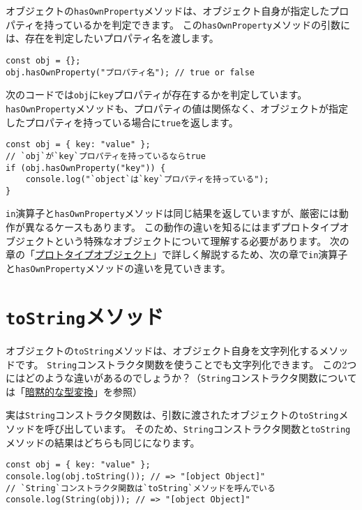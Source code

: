 オブジェクトの\texttt{hasOwnProperty}メソッドは、オブジェクト自身が指定したプロパティを持っているかを判定できます。
この\texttt{hasOwnProperty}メソッドの引数には、存在を判定したいプロパティ名を渡します。

\begin{lstlisting}
const obj = {};
obj.hasOwnProperty("プロパティ名"); // true or false
\end{lstlisting}

次のコードでは\texttt{obj}に\texttt{key}プロパティが存在するかを判定しています。
\texttt{hasOwnProperty}メソッドも、プロパティの値は関係なく、オブジェクトが指定したプロパティを持っている場合に\texttt{true}を返します。

\begin{lstlisting}
const obj = { key: "value" };
// `obj`が`key`プロパティを持っているならtrue
if (obj.hasOwnProperty("key")) {
    console.log("`object`は`key`プロパティを持っている");
}
\end{lstlisting}

\texttt{in}演算子と\texttt{hasOwnProperty}メソッドは同じ結果を返していますが、厳密には動作が異なるケースもあります。
この動作の違いを知るにはまずプロトタイプオブジェクトという特殊なオブジェクトについて理解する必要があります。
次の章の「\href{../prototype-object/README.md}{プロトタイプオブジェクト}」で詳しく解説するため、次の章で\texttt{in}演算子と\texttt{hasOwnProperty}メソッドの違いを見ていきます。

\hypertarget{toString-method}{%
\section{\texorpdfstring{\texttt{toString}メソッド}{toStringメソッド}}\label{toString-method}}

オブジェクトの\texttt{toString}メソッドは、オブジェクト自身を文字列化するメソッドです。
\texttt{String}コンストラクタ関数を使うことでも文字列化できます。
この2つにはどのような違いがあるのでしょうか？（\texttt{String}コンストラクタ関数については「\href{../implicit-coercion/README.md\#to-string}{暗黙的な型変換}」を参照）

実は\texttt{String}コンストラクタ関数は、引数に渡されたオブジェクトの\texttt{toString}メソッドを呼び出しています。
そのため、\texttt{String}コンストラクタ関数と\texttt{toString}メソッドの結果はどちらも同じになります。

\begin{lstlisting}
const obj = { key: "value" };
console.log(obj.toString()); // => "[object Object]"
// `String`コンストラクタ関数は`toString`メソッドを呼んでいる
console.log(String(obj)); // => "[object Object]"
\end{lstlisting}


